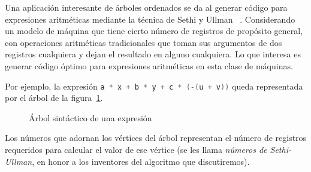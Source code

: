 
  Una aplicación interesante de árboles ordenados
  se da al generar código
  para expresiones aritméticas
  mediante la técnica de Sethi y Ullman~%
    \cite{sethi70:_gener_optim_code_arith_expres}.
  Considerando un modelo de máquina
  que tiene cierto número de registros de propósito general,
  con operaciones aritméticas tradicionales
  que toman sus argumentos de dos registros cualquiera
  y dejan el resultado en alguno cualquiera.
  Lo que interesa
  es generar código óptimo para expresiones aritméticas
  en esta clase de máquinas.

   Por ejemplo,
   la expresión
     \lstinline[language=C]!a * x + b * y + c * (-(u + v))!
   queda representada
   por el árbol de la figura~\ref{fig:Sethi-Ullman}.
  \begin{figure}[htbp]
    \centering
    \caption{Árbol sintáctico de una expresión}
    \label{fig:Sethi-Ullman}
  \end{figure}%
  Los números que adornan los vértices del árbol
  representan el número de registros requeridos
  para calcular el valor de ese vértice
  (se les llama \emph{números de Sethi-Ullman},%
   en honor a los inventores del algoritmo que discutiremos).

